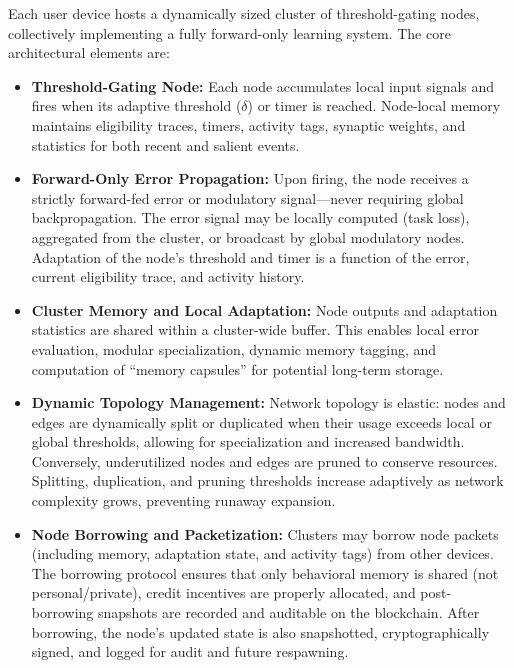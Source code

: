 \documentclass[11pt]{article}
\begin{document}
Each user device hosts a dynamically sized cluster of threshold-gating nodes, collectively implementing a fully forward-only learning system. The core architectural elements are:

\begin{itemize}
    \item \textbf{Threshold-Gating Node:} Each node accumulates local input signals and fires when its adaptive threshold (\(\delta\)) or timer is reached. Node-local memory maintains eligibility traces, timers, activity tags, synaptic weights, and statistics for both recent and salient events.

    \item \textbf{Forward-Only Error Propagation:} Upon firing, the node receives a strictly forward-fed error or modulatory signal—never requiring global backpropagation. The error signal may be locally computed (task loss), aggregated from the cluster, or broadcast by global modulatory nodes. Adaptation of the node’s threshold and timer is a function of the error, current eligibility trace, and activity history.

    \item \textbf{Cluster Memory and Local Adaptation:} Node outputs and adaptation statistics are shared within a cluster-wide buffer. This enables local error evaluation, modular specialization, dynamic memory tagging, and computation of “memory capsules” for potential long-term storage.

    \item \textbf{Dynamic Topology Management:} Network topology is elastic: nodes and edges are dynamically split or duplicated when their usage exceeds local or global thresholds, allowing for specialization and increased bandwidth. Conversely, underutilized nodes and edges are pruned to conserve resources. Splitting, duplication, and pruning thresholds increase adaptively as network complexity grows, preventing runaway expansion.

    \item \textbf{Node Borrowing and Packetization:} Clusters may borrow node packets (including memory, adaptation state, and activity tags) from other devices. The borrowing protocol ensures that only behavioral memory is shared (not personal/private), credit incentives are properly allocated, and post-borrowing snapshots are recorded and auditable on the blockchain. After borrowing, the node’s updated state is also snapshotted, cryptographically signed, and logged for audit and future respawning.
\end{itemize}
\end{document}
